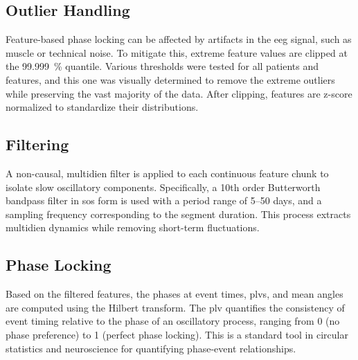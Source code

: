 \subsection{Outlier Handling} \label{subsec:cycle-outlier}
Feature-based phase locking can be affected by artifacts in the \gls{eeg} signal, such as muscle or technical noise.
To mitigate this, extreme feature values are clipped at the \SI{99.999}{\percent} quantile.
Various thresholds were tested for all patients and features, and this one was visually determined to remove the extreme outliers while preserving the vast majority of the data.
After clipping, features are z-score normalized to standardize their distributions.

\subsection{Filtering} \label{subsec:cycle-filtering}
A non-causal, multidien filter is applied to each continuous feature chunk to isolate slow oscillatory components.
Specifically, a 10th order Butterworth bandpass filter in \gls{sos} form is used with a period range of 5--50 days, and a sampling frequency corresponding to the segment duration.
This process extracts multidien dynamics while removing short-term fluctuations.

\subsection{Phase Locking} \label{subsec:phase-locking}
Based on the filtered features, the phases at event times, \glspl{plv}, and mean angles are computed using the Hilbert transform.
The \gls{plv} quantifies the consistency of event timing relative to the phase of an oscillatory process, ranging from 0 (no phase preference) to 1 (perfect phase locking).
This is a standard tool in circular statistics and neuroscience for quantifying phase-event relationships.

